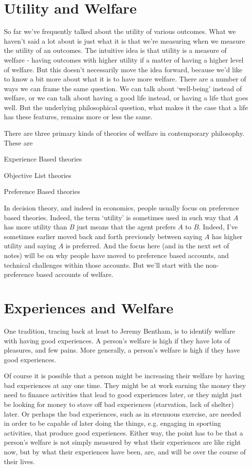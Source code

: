 \section{Utility and Welfare}
So far we've frequently talked about the utility of various outcomes. What we haven't said a lot about is just what it is that we're measuring when we measure the utility of an outcomes. The intuitive idea is that utility is a measure of welfare - having outcomes with higher utility if a matter of having a higher level of welfare. But this doesn't necessarily move the idea forward, because we'd like to know a bit more about what it is to have more welfare. There are a number of ways we can frame the same question. We can talk about `well-being' instead of welfare, or we can talk about having a good life instead, or having a life that goes well. But the underlying philosophical question, what makes it the case that a life has these features, remains more or less the same.

There are three primary kinds of theories of welfare in contemporary philosophy. These are
\begin{itemize*}
\item Experience Based theories
\item Objective List theories
\item Preference Based theories
\end{itemize*}
\noindent In decision theory, and indeed in economics, people usually focus on preference based theories. Indeed, the term `utility' is sometimes used in such way that $A$ has more utility than $B$ just means that the agent prefers $A$ to $B$. Indeed, I've sometimes earlier moved back and forth previously between saying $A$ has higher utility and saying $A$ is preferred. And the focus here (and in the next set of notes) will be on why people have moved to preference based accounts, and technical challenges within those accounts. But we'll start with the non-preference based accounts of welfare.

\section{Experiences and Welfare}
One tradition, tracing back at least to Jeremy Bentham, is to identify welfare with having good experiences. A person's welfare is high if they have lots of pleasures, and few pains. More generally, a person's welfare is high if they have good experiences. 

Of course it is possible that a person might be increasing their welfare by having bad experiences at any one time. They might be at work earning the money they need to finance activities that lead to good experiences later, or they might just be looking for money to stave off bad experiences (starvation, lack of shelter) later. Or perhaps the bad experiences, such as in strenuous exercise, are needed in order to be capable of later doing the things, e.g. engaging in sporting activities, that produce good experiences. Either way, the point has to be that a person's welfare is not simply measured by what their experiences are like right now, but by what their experiences have been, are, and will be over the course of their lives.


